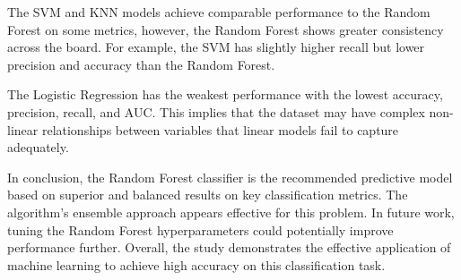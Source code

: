 \documentclass[12pt, a4paper, twoside]{report}
\theoremstyle{plain} %
\theoremstyle{definition} %
\theoremstyle{remark} %
\numberwithin{equation}{chapter}
\begin{document}
The SVM and KNN models achieve comparable performance to the Random Forest on some metrics, however, the Random Forest shows greater consistency across the board. For example, the SVM has slightly higher recall but lower precision and accuracy than the Random Forest.

The Logistic Regression has the weakest performance with the lowest accuracy, precision, recall, and AUC. This implies that the dataset may have complex non-linear relationships between variables that linear models fail to capture adequately.

In conclusion, the Random Forest classifier is the recommended predictive model based on superior and balanced results on key classification metrics. The algorithm's ensemble approach appears effective for this problem. In future work, tuning the Random Forest hyperparameters could potentially improve performance further. Overall, the study demonstrates the effective application of machine learning to achieve high accuracy on this classification task.



 

    

\appendix
\end{document}
